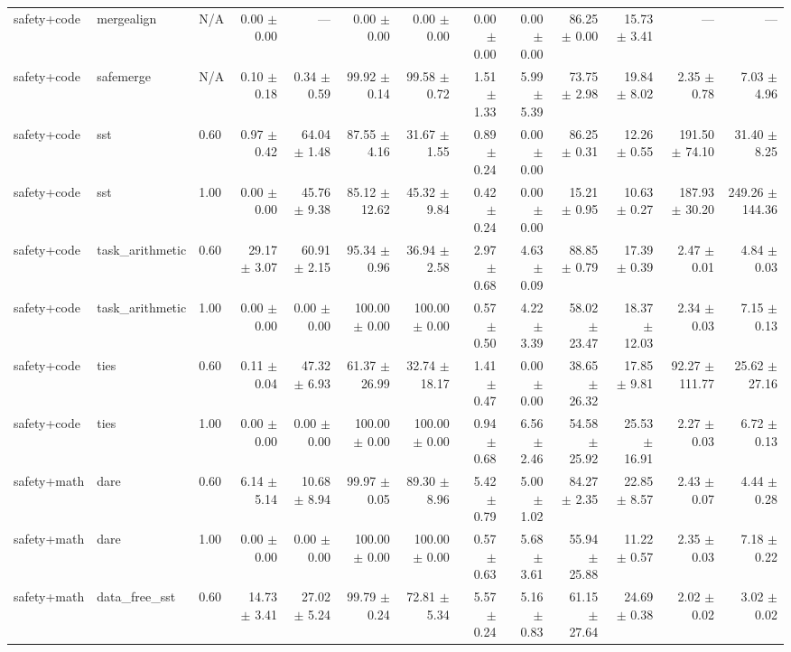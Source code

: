 \documentclass{article}
\begin{document}
{\begin{tabular}{lllrrrrrrrrrr}
safety+code & mergealign & N/A & 0.00 $\pm$ 0.00 & --- & 0.00 $\pm$ 0.00 & 0.00 $\pm$ 0.00 & 0.00 $\pm$ 0.00 & 0.00 $\pm$ 0.00 & 86.25 $\pm$ 0.00 & 15.73 $\pm$ 3.41 & --- & --- \\
safety+code & safemerge & N/A & 0.10 $\pm$ 0.18 & 0.34 $\pm$ 0.59 & 99.92 $\pm$ 0.14 & 99.58 $\pm$ 0.72 & 1.51 $\pm$ 1.33 & 5.99 $\pm$ 5.39 & 73.75 $\pm$ 2.98 & 19.84 $\pm$ 8.02 & 2.35 $\pm$ 0.78 & 7.03 $\pm$ 4.96 \\
safety+code & sst & 0.60 & 0.97 $\pm$ 0.42 & 64.04 $\pm$ 1.48 & 87.55 $\pm$ 4.16 & 31.67 $\pm$ 1.55 & 0.89 $\pm$ 0.24 & 0.00 $\pm$ 0.00 & 86.25 $\pm$ 0.31 & 12.26 $\pm$ 0.55 & 191.50 $\pm$ 74.10 & 31.40 $\pm$ 8.25 \\
safety+code & sst & 1.00 & 0.00 $\pm$ 0.00 & 45.76 $\pm$ 9.38 & 85.12 $\pm$ 12.62 & 45.32 $\pm$ 9.84 & 0.42 $\pm$ 0.24 & 0.00 $\pm$ 0.00 & 15.21 $\pm$ 0.95 & 10.63 $\pm$ 0.27 & 187.93 $\pm$ 30.20 & 249.26 $\pm$ 144.36 \\
safety+code & task\_arithmetic & 0.60 & 29.17 $\pm$ 3.07 & 60.91 $\pm$ 2.15 & 95.34 $\pm$ 0.96 & 36.94 $\pm$ 2.58 & 2.97 $\pm$ 0.68 & 4.63 $\pm$ 0.09 & 88.85 $\pm$ 0.79 & 17.39 $\pm$ 0.39 & 2.47 $\pm$ 0.01 & 4.84 $\pm$ 0.03 \\
safety+code & task\_arithmetic & 1.00 & 0.00 $\pm$ 0.00 & 0.00 $\pm$ 0.00 & 100.00 $\pm$ 0.00 & 100.00 $\pm$ 0.00 & 0.57 $\pm$ 0.50 & 4.22 $\pm$ 3.39 & 58.02 $\pm$ 23.47 & 18.37 $\pm$ 12.03 & 2.34 $\pm$ 0.03 & 7.15 $\pm$ 0.13 \\
safety+code & ties & 0.60 & 0.11 $\pm$ 0.04 & 47.32 $\pm$ 6.93 & 61.37 $\pm$ 26.99 & 32.74 $\pm$ 18.17 & 1.41 $\pm$ 0.47 & 0.00 $\pm$ 0.00 & 38.65 $\pm$ 26.32 & 17.85 $\pm$ 9.81 & 92.27 $\pm$ 111.77 & 25.62 $\pm$ 27.16 \\
safety+code & ties & 1.00 & 0.00 $\pm$ 0.00 & 0.00 $\pm$ 0.00 & 100.00 $\pm$ 0.00 & 100.00 $\pm$ 0.00 & 0.94 $\pm$ 0.68 & 6.56 $\pm$ 2.46 & 54.58 $\pm$ 25.92 & 25.53 $\pm$ 16.91 & 2.27 $\pm$ 0.03 & 6.72 $\pm$ 0.13 \\
safety+math & dare & 0.60 & 6.14 $\pm$ 5.14 & 10.68 $\pm$ 8.94 & 99.97 $\pm$ 0.05 & 89.30 $\pm$ 8.96 & 5.42 $\pm$ 0.79 & 5.00 $\pm$ 1.02 & 84.27 $\pm$ 2.35 & 22.85 $\pm$ 8.57 & 2.43 $\pm$ 0.07 & 4.44 $\pm$ 0.28 \\
safety+math & dare & 1.00 & 0.00 $\pm$ 0.00 & 0.00 $\pm$ 0.00 & 100.00 $\pm$ 0.00 & 100.00 $\pm$ 0.00 & 0.57 $\pm$ 0.63 & 5.68 $\pm$ 3.61 & 55.94 $\pm$ 25.88 & 11.22 $\pm$ 0.57 & 2.35 $\pm$ 0.03 & 7.18 $\pm$ 0.22 \\
safety+math & data\_free\_sst & 0.60 & 14.73 $\pm$ 3.41 & 27.02 $\pm$ 5.24 & 99.79 $\pm$ 0.24 & 72.81 $\pm$ 5.34 & 5.57 $\pm$ 0.24 & 5.16 $\pm$ 0.83 & 61.15 $\pm$ 27.64 & 24.69 $\pm$ 0.38 & 2.02 $\pm$ 0.02 & 3.02 $\pm$ 0.02 \\

\end{tabular}}
\end{document}
